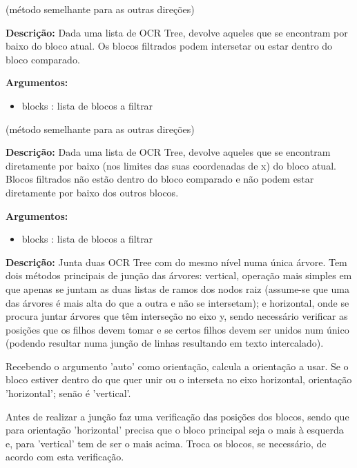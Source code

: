 (método semelhante para as outras direções)

\textbf{Descrição:} Dada uma lista de OCR Tree, devolve aqueles que se encontram por baixo do bloco atual. Os blocos filtrados podem intersetar ou estar dentro do bloco comparado.


\textbf{Argumentos:}
\begin{itemize}\setlength\itemsep{-0.3em}
	\vspace{-0.5em}
	\item blocks : lista de blocos a filtrar
\end{itemize}



(método semelhante para as outras direções)

\textbf{Descrição:} Dada uma lista de OCR Tree, devolve aqueles que se encontram diretamente por baixo (nos limites das suas coordenadas de x) do bloco atual. Blocos filtrados não estão dentro do bloco comparado e não podem estar diretamente por baixo dos outros blocos.


\textbf{Argumentos:}
\begin{itemize}\setlength\itemsep{-0.3em}
	\vspace{-0.5em}
	\item blocks : lista de blocos a filtrar
\end{itemize}
	
	
	

\textbf{Descrição:} Junta duas OCR Tree com do mesmo nível numa única árvore. Tem dois métodos principais de junção das árvores: vertical, operação mais simples em que apenas se juntam as duas listas de ramos dos nodos raiz (assume-se que uma das árvores é mais alta do que a outra e não se intersetam); e horizontal, onde se procura juntar árvores que têm interseção no eixo y, sendo necessário verificar as posições que os filhos devem tomar e se certos filhos devem ser unidos num único (podendo resultar numa junção de linhas resultando em texto intercalado).

Recebendo o argumento 'auto' como orientação, calcula a orientação a usar. Se o bloco estiver dentro do que quer unir ou o interseta no eixo horizontal, orientação 'horizontal'; senão é 'vertical'.

Antes de realizar a junção faz uma verificação das posições dos blocos, sendo que para orientação 'horizontal' precisa que o bloco principal seja o mais à esquerda e, para 'vertical' tem de ser o mais acima. Troca os blocos, se necessário, de acordo com esta verificação.



